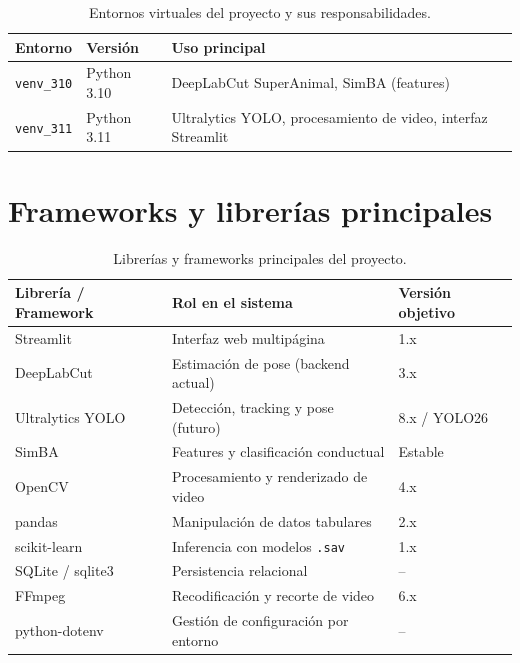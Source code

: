 \documentclass[12pt]{report}
\begin{document}
\begin{table}[H]
    \centering
    \begin{tabular}{@{}llp{6cm}@{}}
        \toprule
        \textbf{Entorno} & \textbf{Versión} & \textbf{Uso principal} \\
        \midrule
        \texttt{venv\_310} & Python 3.10 & DeepLabCut SuperAnimal, SimBA (features) \\
        \texttt{venv\_311} & Python 3.11 & Ultralytics YOLO, procesamiento de video, interfaz Streamlit \\
        \bottomrule
    \end{tabular}
    \caption{Entornos virtuales del proyecto y sus responsabilidades.}
    \label{tab:envs}
\end{table}

\section{Frameworks y librerías principales}

\begin{table}[H]
    \centering
    \begin{tabular}{@{}lll@{}}
        \toprule
        \textbf{Librería / Framework} & \textbf{Rol en el sistema} & \textbf{Versión objetivo} \\
        \midrule
        Streamlit            & Interfaz web multipágina            & 1.x \\
        DeepLabCut           & Estimación de pose (backend actual) & 3.x \\
        Ultralytics YOLO     & Detección, tracking y pose (futuro) & 8.x / YOLO26 \\
        SimBA                & Features y clasificación conductual & Estable \\
        OpenCV               & Procesamiento y renderizado de video & 4.x \\
        pandas               & Manipulación de datos tabulares     & 2.x \\
        scikit-learn         & Inferencia con modelos \texttt{.sav} & 1.x \\
        SQLite / sqlite3     & Persistencia relacional             & -- \\
        FFmpeg               & Recodificación y recorte de video   & 6.x \\
        python-dotenv        & Gestión de configuración por entorno & -- \\
        \bottomrule
    \end{tabular}
    \caption{Librerías y frameworks principales del proyecto.}
    \label{tab:librerias}
\end{table}
\end{document}
